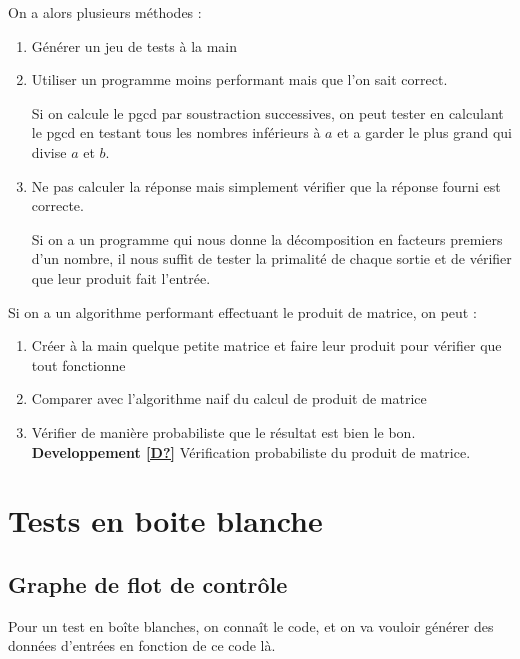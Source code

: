 \noindent On a alors plusieurs méthodes : \begin{enumerate}
	\item Générer un jeu de tests à la main
	\item Utiliser un programme moins performant mais que l'on sait correct.
	\begin{example}
		Si on calcule le pgcd par soustraction successives, on peut tester en calculant le pgcd en testant tous les nombres inférieurs à $a$ et a garder le plus grand qui divise $a$ et $b$.
	\end{example}
	\item Ne pas calculer la réponse mais simplement vérifier que la réponse fourni est correcte.
	\begin{example}
		Si on a un programme qui nous donne la décomposition en facteurs premiers d'un nombre, il nous suffit de tester la primalité de chaque sortie et de vérifier que leur produit fait l'entrée.
	\end{example}
\end{enumerate}

\begin{example}
	Si on a un algorithme performant effectuant le produit de matrice, on peut : \begin{enumerate}
		\item Créer à la main quelque petite matrice et faire leur produit pour vérifier que tout fonctionne
		\item Comparer avec l'algorithme naif du calcul de produit de matrice
		\item Vérifier de manière probabiliste que le résultat est bien le bon.\\
		\textbf{Developpement \ref{D?}} Vérification probabiliste du produit de matrice.
	\end{enumerate}
\end{example}

\section{Tests en boite blanche}

\subsection{Graphe de flot de contrôle}

Pour un test en boîte blanches, on connaît le code, et on va vouloir générer des données d'entrées en fonction de ce code là.\\

